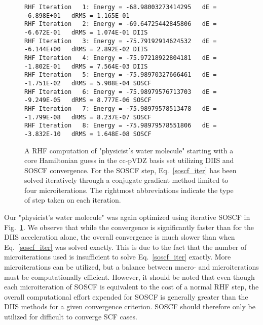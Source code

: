 \documentclass[aip,jcp,preprint,superscriptaddress,floatfix]{revtex4-1}
\begin{document}
\begin{figure}[htbp]
\begin{center}
\caption{A RHF computation of "physicist's water molecule" starting with a core Hamiltonian guess in the cc-pVDZ basis set utilizing DIIS and SOSCF convergence. For the SOSCF step, Eq.~\ref{soscf_iter} has been solved iteratively through a conjugate gradient method limited to four microiterations. The rightmost abbreviations indicate the type of step taken on each iteration.}
\label{rhf_water_soscf_iter}
{\footnotesize\linespread{1}\normalfont\ttfamily
\begin{verbatim}
RHF Iteration   1: Energy = -68.98003273414295   dE = -6.898E+01   dRMS = 1.165E-01
RHF Iteration   2: Energy = -69.64725442845806   dE = -6.672E-01   dRMS = 1.074E-01 DIIS
RHF Iteration   3: Energy = -75.79192914624532   dE = -6.144E+00   dRMS = 2.892E-02 DIIS
RHF Iteration   4: Energy = -75.97218922804181   dE = -1.802E-01   dRMS = 7.564E-03 DIIS
RHF Iteration   5: Energy = -75.98970327666461   dE = -1.751E-02   dRMS = 5.908E-04 SOSCF
RHF Iteration   6: Energy = -75.98979576713703   dE = -9.249E-05   dRMS = 8.777E-06 SOSCF
RHF Iteration   7: Energy = -75.98979578513478   dE = -1.799E-08   dRMS = 8.237E-07 SOSCF
RHF Iteration   8: Energy = -75.98979578551806   dE = -3.832E-10   dRMS = 1.648E-08 SOSCF
\end{verbatim}}
\end{center}
\end{figure}

Our "physicist's water molecule" was again optimized using iterative SOSCF in Fig.~\ref{rhf_water_soscf_iter}.
We observe that while the convergence is significantly faster than for the DIIS acceleration alone, the overall convergence is much slower than when Eq.~\ref{soscf_iter} was solved exactly.
This is due to the fact that the number of microiterations used is insufficient to solve Eq.~\ref{soscf_iter} exactly.
More microiterations can be utilized, but a balance between macro- and microiterations must be computationally efficient.
However, it should be noted that even though each microiteration of SOSCF is equivalent to the cost of a normal RHF step, the overall computational effort expended for SOSCF is generally greater than the DIIS methods for a given convergence criterion.
SOSCF should therefore only be utilized for difficult to converge SCF cases.




\end{document}
